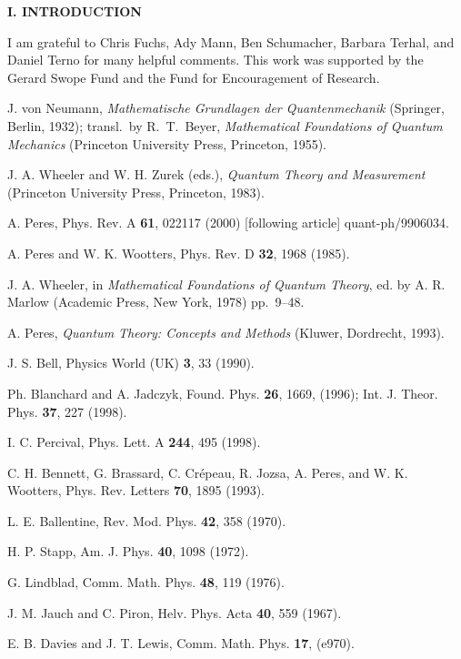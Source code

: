 \begin{center}{\bf I. INTRODUCTION}
\ec

I am grateful to Chris Fuchs, Ady Mann, Ben Schumacher, Barbara Terhal,
and Daniel Terno for many helpful comments. This work was supported by
the Gerard Swope Fund and the Fund for Encouragement of Research.
\clearpage

\begin{thebibliography}{99}

 J. von Neumann, {\it Mathematische Grundlagen der
Quantenmechanik\/} (Springer, Berlin, 1932); transl.\ by R.~T.~Beyer,
{\it Mathematical Foundations of Quantum Mechanics\/} (Princeton
University Press, Princeton, 1955).

 J. A. Wheeler and W. H. Zurek (eds.), {\it Quantum Theory
and Measurement\/} (Princeton University Press, Princeton, 1983).

 A. Peres, Phys. Rev. A {\bf61}, 022117 (2000) [following
article] quant-ph/9906034.

 A. Peres and W. K. Wootters, Phys. Rev. D {\bf32}, 1968
(1985).

 J. A. Wheeler, in {\it Mathematical Foundations of
Quantum Theory\/}, ed. by A. R. Marlow (Academic Press, New York, 1978)
pp.~9--48.

 A. Peres, {\it Quantum Theory: Concepts and Methods\/}
(Kluwer, Dordrecht, 1993).

 J. S. Bell, Physics World (UK) {\bf3}, 33 (1990).

 Ph. Blanchard and A. Jadczyk, Found. Phys. {\bf26}, 1669,
(1996); Int. J. Theor. Phys. {\bf37}, 227 (1998).

 I. C. Percival, Phys. Lett. A {\bf244}, 495 (1998).

 C. H. Bennett, G. Brassard, C. Cr\'epeau, R. Jozsa, A.
Peres, and W. K. Wootters, Phys. Rev. Letters {\bf70}, 1895 (1993).

 L. E. Ballentine, Rev. Mod. Phys. {\bf42}, 358 (1970).

 H. P. Stapp, Am. J. Phys. {\bf40}, 1098 (1972).

 G. Lindblad, Comm. Math. Phys. {\bf48}, 119 (1976).

 J. M. Jauch and C. Piron, Helv. Phys. Acta {\bf40}, 559
(1967).

 E. B. Davies and J. T. Lewis, Comm. Math. Phys. {\bf17},
(e970).


\end{thebibliography}
\end{center}
